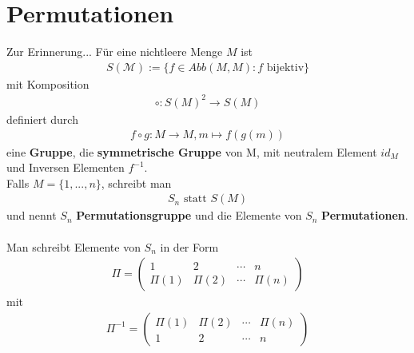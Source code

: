 \documentclass[11pt]{report}
\newcommand*\f[1] {\textbf{#1}}
\begin{document}
\section{Permutationen}
Zur Erinnerung... Für eine nichtleere Menge $M$ ist
\begin{align}
S(\mathcal{M}) := \{f \in Abb(M,M): f \text{ bijektiv}\}
\end{align}
mit Komposition
\begin{align}
\circ : S(M)^2 \rightarrow S(M)
\end{align}
definiert durch
\begin{align}
 f \circ g: M \rightarrow M, m \mapsto f(g(m))
\end{align}
eine \f{Gruppe}, die \f{symmetrische Gruppe} von M, mit neutralem Element $id_M$ und Inversen Elementen $f^{-1}$. \\
Falls $M = \{1, ..., n\}$, schreibt man 
\begin{align}
S_n \text{ statt } S(M)
\end{align}
und nennt $S_n$ \f{Permutationsgruppe} und die Elemente von $S_n$ \f{Permutationen}.\\\\
Man schreibt Elemente von $S_n$ in der Form
\begin{align}
\Pi = \begin{pmatrix} 1 & 2 & \cdots & n \\ \Pi(1) & \Pi(2) & \cdots & \Pi(n) \end{pmatrix}
\end{align}
mit
\begin{align}
\Pi^{-1} = \begin{pmatrix} \Pi(1) & \Pi(2) & \cdots & \Pi(n) \\ 1 & 2 & \cdots & n \end{pmatrix}
\end{align}
\end{document}
